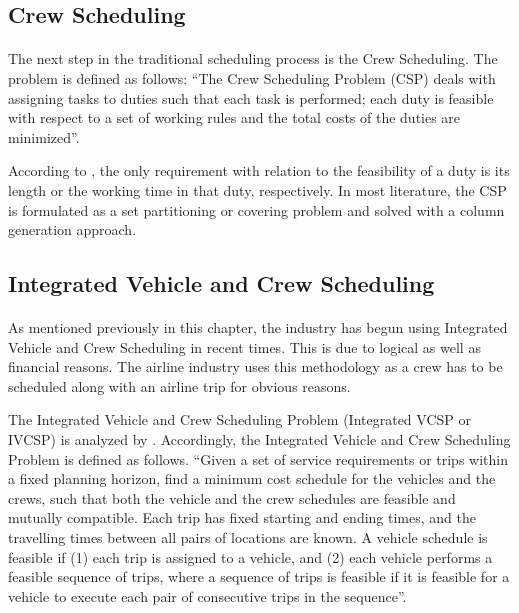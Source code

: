 \documentclass[12pt, oneside]{report}
\begin{document}
\subsection {Crew Scheduling}

\paragraph{ } The next step in the traditional scheduling process is the Crew Scheduling.  The problem is defined as follows: “The Crew Scheduling Problem (CSP) deals with assigning tasks to duties such that each task is performed; each duty is feasible with respect to a set of working rules and the total costs of the duties are minimized”. 

According to \citep{Huisman2004}, the only requirement with relation to the feasibility of a duty is its length or the working time in that duty, respectively. In most literature, the CSP is formulated as a set partitioning or covering problem and solved with a column generation approach.

\subsection {Integrated Vehicle and Crew Scheduling}

\paragraph{ } As mentioned previously in this chapter, the industry has begun using Integrated Vehicle and Crew Scheduling in recent times. This is due to logical as well as financial reasons. The airline industry uses this methodology as a crew has to be scheduled along with an airline trip for obvious reasons.

The Integrated Vehicle and Crew Scheduling Problem (Integrated VCSP or IVCSP) is analyzed by \citet{Huisman2004}. Accordingly, the Integrated Vehicle and Crew Scheduling Problem is defined as follows. “Given a set of service requirements or trips within a fixed planning horizon, find a minimum cost schedule for the vehicles and the crews, such that both the vehicle and the crew schedules are feasible and mutually compatible. Each trip has fixed starting and ending times, and the travelling times between all pairs of locations are known. A vehicle schedule is feasible if (1) each trip is assigned to a vehicle, and (2) each vehicle performs a feasible sequence of trips, where a sequence of trips is feasible if it is feasible for a vehicle to execute each pair of consecutive trips in the sequence”.
\end{document}
